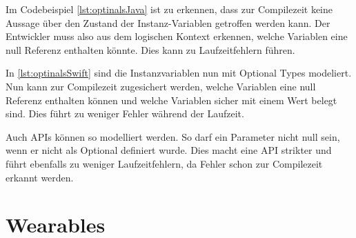 Im Codebeispiel \ref{lst:optinalsJava} ist zu erkennen, dass zur Compilezeit keine Aussage über den Zustand der Instanz-Variablen getroffen werden kann. Der Entwickler muss also aus dem logischen Kontext erkennen, welche Variablen eine null Referenz enthalten könnte. Dies kann zu Laufzeitfehlern führen.


In \ref{lst:optinalsSwift} sind die Instanzvariablen nun mit Optional Types modeliert. Nun 
kann zur Compilezeit zugesichert werden, welche Variablen eine null Referenz enthalten können und welche Variablen sicher mit einem Wert belegt sind. Dies führt zu weniger Fehler während der Laufzeit.

Auch APIs können so modelliert werden. So darf ein Parameter nicht null sein, wenn er nicht als Optional definiert wurde. Dies macht eine API strikter und führt ebenfalls zu weniger Laufzeitfehlern, da Fehler schon zur Compilezeit erkannt werden.

\section{Wearables}

